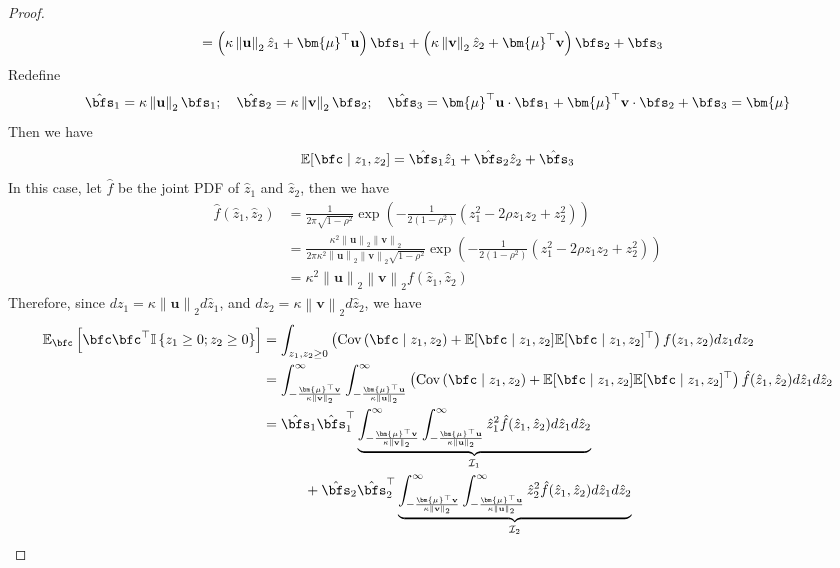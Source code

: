 \documentclass[10pt]{article} %
\theoremstyle{definition}
\theoremstyle{plain}
\newcommand{\paren}[1]{\left(#1\right)}
\newcommand{\norm}[1]{\left\|#1\right\|}
\providecommand{\E}{\mathbb{E}}
\def\bfu{{\mathbf{u}}}\def\bfv{{\mathbf{v}}}\def\bfw{{\mathbf{w}}}\def\bfx{{\mathbf{x}}}
\begin{document}
\begin{proof}
\begin{align*}
        & = \paren{\kappa\norm{\bfu}_2\hat{z}_1 + \bm{\mu}^\top\bfu}\bfs_1 + \paren{\kappa\norm{\bfv}_2\hat{z}_2 + \bm{\mu}^\top\bfv}\bfs_2 + \bfs_3
    \end{align*}
    Redefine
    \[
        \hat{\bfs}_1 = \kappa\norm{\bfu}_2\bfs_1;\quad\hat{\bfs}_2 = \kappa\norm{\bfv}_2\bfs_2;\quad\hat{\bfs}_3 = \bm{\mu}^\top\bfu\cdot\bfs_1 + \bm{\mu}^\top\bfv\cdot\bfs_2 + \bfs_3 = \bm{\mu}
    \]
    Then we have
    \[
        \E[\bfc\mid z_1,z_2] = \hat{\bfs}_1\hat{z}_1+\hat{\bfs}_2\hat{z}_2 + \hat{\bfs}_3
    \]
    In this case, let $\hat{f}$ be the joint PDF of $\hat{z}_1$ and $\hat{z}_2$, then we have
    \begin{align*}
        \hat{f}\paren{\hat{z}_1,\hat{z}_2} & = \frac{1}{2\pi\sqrt{1 - \rho^2}}\exp\paren{-\frac{1}{2(1-\rho^2)}\paren{z_1^2 - 2\rho z_1z_2 + z_2^2}}\\
        & = \frac{\kappa^2\norm{\bfu}_2\norm{\bfv}_2}{2\pi\kappa^2\norm{\bfu}_2\norm{\bfv}_2\sqrt{1-\rho^2}}\exp\paren{- 
     \frac{1}{2(1-\rho^2)}\paren{z_1^2 - 2\rho z_1z_2 + z_2^2}}\\
        & = \kappa^2\norm{\bfu}_2\norm{\bfv}_2f\paren{\hat{z}_1,\hat{z}_2}
    \end{align*}
    Therefore, since $dz_1 = \kappa\norm{\bfu}_2d\hat{z}_1$, and $dz_2 = \kappa\norm{\bfv}_2d\hat{z}_2$, we have
    \begin{align*}
        \E_{\bfc}\left[\bfc\bfc^\top\mathbb{I}\left\{z_1\geq 0;z_2\geq 0\right\}\right] & = \int_{z_1,z_2\geq 0}\paren{\text{Cov}\paren{\bfc\mid z_1,z_2} + \E[\bfc\mid z_1,z_2]\E[\bfc\mid z_1,z_2]^\top}f(z_1,z_2)dz_1dz_2\\
        & = \int_{-\frac{\bm{\mu}^\top\bfv}{\kappa\norm{\bfv}_2}}^\infty\int_{-\frac{\bm{\mu}^\top\bfu}{\kappa\norm{\bfu}_2}}^\infty\paren{\text{Cov}\paren{\bfc\mid z_1,z_2} + \E[\bfc\mid z_1,z_2]\E[\bfc\mid z_1,z_2]^\top}\hat{f}(\hat{z}_1,\hat{z}_2)d\hat{z}_1d\hat{z}_2\\
        & = \hat{\bfs}_1\hat{\bfs}_1^\top\underbrace{\int_{-\frac{\bm{\mu}^\top\bfv}{\kappa\norm{\bfv}_2}}^\infty\int_{-\frac{\bm{\mu}^\top\bfu}{\kappa\norm{\bfu}_2}}^\infty\hat{z}_1^2\hat{f}(\hat{z}_1,\hat{z}_2)d\hat{z}_1d\hat{z}_2}_{\mathcal{I}_1}\\
        & \quad\quad\quad + \hat{\bfs}_2\hat{\bfs}_2^\top\underbrace{\int_{-\frac{\bm{\mu}^\top\bfv}{\kappa\norm{\bfv}_2}}^\infty\int_{-\frac{\bm{\mu}^\top\bfu}{\kappa\norm{\bfu}_2}}^\infty\hat{z}_2^2\hat{f}(\hat{z}_1,\hat{z}_2)d\hat{z}_1d\hat{z}_2}_{\mathcal{I}_2}\\

\end{align*}
\end{proof}
\end{document}
